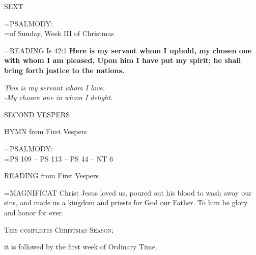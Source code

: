 \begin{flushleft}\normalsize SEXT\\\end{flushleft}

\hangindent=\parindent \small{PSALMODY:}\\
\hangindent=\parindent  of Sunday, Week III of Christmas\vspace{0.5em}

\hangindent=\parindent \small{\uppercase{READING}}  Is 42:1 \textbf{ Here is my servant whom I uphold, my chosen one with whom I am pleased. Upon him I have put my spirit; he shall bring forth justice to the nations.\\}

\begin{center}
\textit{This is my servant whom I love.\\
-My chosen one in whom I delight.}
\end{center}

\begin{flushleft}\normalsize SECOND VESPERS\\\end{flushleft}

HYMN from First Vespers

\hangindent=\parindent \small{PSALMODY:}\\
\hangindent=\parindent  PS 109 -- PS 113 -- PS 44 -- NT 6\vspace{0.5em}

READING from First Vespers

\hangindent=\parindent \small{MAGNIFICAT 	Christ Jesus loved us, poured out his blood to wash away our sins, and made us a kingdom and priests for God our Father. To him be glory and honor for ever.\\}

\begin{center}\noindent\textsc{\small{This completes Christmas Season;\\}}\end{center}
it is followed by the first week of Ordinary Time.
